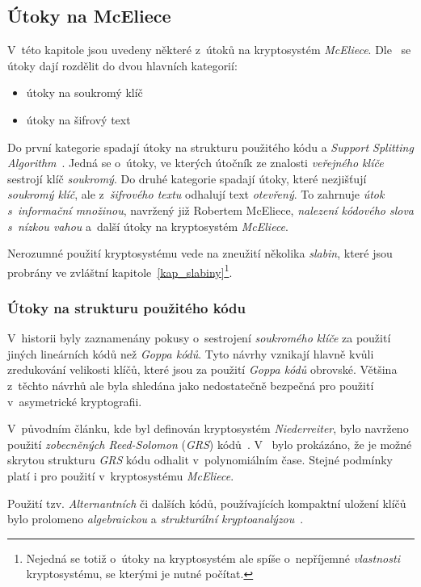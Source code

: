 \documentclass[thesis=M,czech,hidelinks]{FITthesis}[2012/06/26]
\newcommand{\0}{{\textcolor[gray]{0.80}{0}}}
\begin{document}
\subsection{Útoky na McEliece}
V~této kapitole jsou uvedeny některé z~útoků na kryptosystém \emph{McEliece}.
Dle~\cite{Engelbert} se útoky dají rozdělit do dvou hlavních kategorií:
\begin{itemize}
    \item útoky na soukromý klíč
    \item útoky na šifrový text
\end{itemize}
Do první kategorie spadají útoky na strukturu použitého kódu a \emph{Support
Splitting Algorithm}~\cite{Sendrier}. Jedná se o~útoky, ve kterých útočník ze znalosti
\emph{veřejného klíče} sestrojí klíč \emph{soukromý}. Do druhé kategorie spadají
útoky, které nezjišťují \emph{soukromý klíč}, ale z~\emph{šifrového textu}
odhalují text \emph{otevřený}. To zahrnuje \emph{útok s~informační množinou},
navržený již Robertem McEliece, \emph{nalezení kódového slova s~nízkou vahou}
a~další útoky na kryptosystém \emph{McEliece}.

Nerozumné použití kryptosystému vede na zneužití několika \emph{slabin}, které
jsou probrány ve zvláštní kapitole~\ref{kap_slabiny}\footnote{
    Nejedná se totiž o~útoky na kryptosystém ale spíše o~nepříjemné
    \emph{vlastnosti} kryptosystému, se kterými je nutné počítat.
}.

\subsubsection{Útoky na strukturu použitého kódu}\label{kap_utoky_na_strukturu_kodu}
V~historii byly zaznamenány pokusy o~sestrojení \emph{soukromého klíče} za
použití jiných lineárních kódů než \emph{Goppa kódů}. Tyto návrhy vznikají
hlavně kvůli zredukování velikosti klíčů, které jsou za použití \emph{Goppa
kódů} obrovské. Většina z~těchto návrhů ale byla shledána jako nedostatečně
bezpečná pro použití v~asymetrické kryptografii.

V~původním článku, kde byl definován kryptosystém \emph{Niederreiter}, bylo
navrženo použití \emph{zobecněných Reed-Solomon} (\emph{GRS})
kódů~\cite{Niederreiter}. V~\cite{Sidelnikov} bylo prokázáno, že je možné
skrytou strukturu \emph{GRS} kódu odhalit v~polynomiálním čase. Stejné podmínky
platí i pro použití v~kryptosystému \emph{McEliece}.

Použití tzv. \emph{Alternantních} či dalších kódů, používajících kompaktní
uložení klíčů bylo prolomeno \emph{algebraickou} a \emph{strukturální
kryptoanalýzou}~\cite{Faugere1,Faugere2,Umana}.
\end{document}
